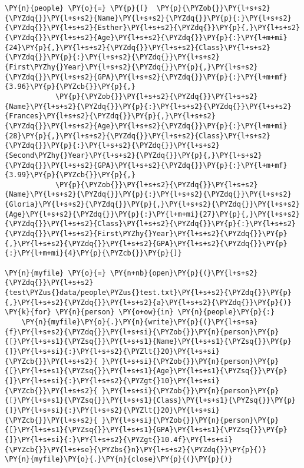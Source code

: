     \begin{tcolorbox}[breakable, size=fbox, boxrule=1pt, pad at break*=1mm,colback=cellbackground, colframe=cellborder]
\begin{Verbatim}[commandchars=\\\{\}]
\PY{n}{people} \PY{o}{=} \PY{p}{[}  \PY{p}{\PYZob{}}\PY{l+s+s2}{\PYZdq{}}\PY{l+s+s2}{Name}\PY{l+s+s2}{\PYZdq{}}\PY{p}{:}\PY{l+s+s2}{\PYZdq{}}\PY{l+s+s2}{Esther}\PY{l+s+s2}{\PYZdq{}}\PY{p}{,}\PY{l+s+s2}{\PYZdq{}}\PY{l+s+s2}{Age}\PY{l+s+s2}{\PYZdq{}}\PY{p}{:}\PY{l+m+mi}{24}\PY{p}{,}\PY{l+s+s2}{\PYZdq{}}\PY{l+s+s2}{Class}\PY{l+s+s2}{\PYZdq{}}\PY{p}{:}\PY{l+s+s2}{\PYZdq{}}\PY{l+s+s2}{First\PYZhy{}Year}\PY{l+s+s2}{\PYZdq{}}\PY{p}{,}\PY{l+s+s2}{\PYZdq{}}\PY{l+s+s2}{GPA}\PY{l+s+s2}{\PYZdq{}}\PY{p}{:}\PY{l+m+mf}{3.96}\PY{p}{\PYZcb{}}\PY{p}{,}
            \PY{p}{\PYZob{}}\PY{l+s+s2}{\PYZdq{}}\PY{l+s+s2}{Name}\PY{l+s+s2}{\PYZdq{}}\PY{p}{:}\PY{l+s+s2}{\PYZdq{}}\PY{l+s+s2}{Frances}\PY{l+s+s2}{\PYZdq{}}\PY{p}{,}\PY{l+s+s2}{\PYZdq{}}\PY{l+s+s2}{Age}\PY{l+s+s2}{\PYZdq{}}\PY{p}{:}\PY{l+m+mi}{28}\PY{p}{,}\PY{l+s+s2}{\PYZdq{}}\PY{l+s+s2}{Class}\PY{l+s+s2}{\PYZdq{}}\PY{p}{:}\PY{l+s+s2}{\PYZdq{}}\PY{l+s+s2}{Second\PYZhy{}Year}\PY{l+s+s2}{\PYZdq{}}\PY{p}{,}\PY{l+s+s2}{\PYZdq{}}\PY{l+s+s2}{GPA}\PY{l+s+s2}{\PYZdq{}}\PY{p}{:}\PY{l+m+mf}{3.99}\PY{p}{\PYZcb{}}\PY{p}{,}
            \PY{p}{\PYZob{}}\PY{l+s+s2}{\PYZdq{}}\PY{l+s+s2}{Name}\PY{l+s+s2}{\PYZdq{}}\PY{p}{:}\PY{l+s+s2}{\PYZdq{}}\PY{l+s+s2}{Gloria}\PY{l+s+s2}{\PYZdq{}}\PY{p}{,}\PY{l+s+s2}{\PYZdq{}}\PY{l+s+s2}{Age}\PY{l+s+s2}{\PYZdq{}}\PY{p}{:}\PY{l+m+mi}{27}\PY{p}{,}\PY{l+s+s2}{\PYZdq{}}\PY{l+s+s2}{Class}\PY{l+s+s2}{\PYZdq{}}\PY{p}{:}\PY{l+s+s2}{\PYZdq{}}\PY{l+s+s2}{First\PYZhy{}Year}\PY{l+s+s2}{\PYZdq{}}\PY{p}{,}\PY{l+s+s2}{\PYZdq{}}\PY{l+s+s2}{GPA}\PY{l+s+s2}{\PYZdq{}}\PY{p}{:}\PY{l+m+mi}{4}\PY{p}{\PYZcb{}}\PY{p}{]}

\PY{n}{myfile} \PY{o}{=} \PY{n+nb}{open}\PY{p}{(}\PY{l+s+s2}{\PYZdq{}}\PY{l+s+s2}{test\PYZus{}data/people\PYZus{}test.txt}\PY{l+s+s2}{\PYZdq{}}\PY{p}{,}\PY{l+s+s2}{\PYZdq{}}\PY{l+s+s2}{a}\PY{l+s+s2}{\PYZdq{}}\PY{p}{)}
\PY{k}{for} \PY{n}{person} \PY{o+ow}{in} \PY{n}{people}\PY{p}{:}
    \PY{n}{myfile}\PY{o}{.}\PY{n}{write}\PY{p}{(}\PY{l+s+sa}{f}\PY{l+s+s2}{\PYZdq{}}\PY{l+s+si}{\PYZob{}}\PY{n}{person}\PY{p}{[}\PY{l+s+s1}{\PYZsq{}}\PY{l+s+s1}{Name}\PY{l+s+s1}{\PYZsq{}}\PY{p}{]}\PY{l+s+si}{:}\PY{l+s+s2}{\PYZlt{}20}\PY{l+s+si}{\PYZcb{}}\PY{l+s+s2}{ }\PY{l+s+si}{\PYZob{}}\PY{n}{person}\PY{p}{[}\PY{l+s+s1}{\PYZsq{}}\PY{l+s+s1}{Age}\PY{l+s+s1}{\PYZsq{}}\PY{p}{]}\PY{l+s+si}{:}\PY{l+s+s2}{\PYZgt{}10}\PY{l+s+si}{\PYZcb{}}\PY{l+s+s2}{ }\PY{l+s+si}{\PYZob{}}\PY{n}{person}\PY{p}{[}\PY{l+s+s1}{\PYZsq{}}\PY{l+s+s1}{Class}\PY{l+s+s1}{\PYZsq{}}\PY{p}{]}\PY{l+s+si}{:}\PY{l+s+s2}{\PYZlt{}20}\PY{l+s+si}{\PYZcb{}}\PY{l+s+s2}{ }\PY{l+s+si}{\PYZob{}}\PY{n}{person}\PY{p}{[}\PY{l+s+s1}{\PYZsq{}}\PY{l+s+s1}{GPA}\PY{l+s+s1}{\PYZsq{}}\PY{p}{]}\PY{l+s+si}{:}\PY{l+s+s2}{\PYZgt{}10.4f}\PY{l+s+si}{\PYZcb{}}\PY{l+s+se}{\PYZbs{}n}\PY{l+s+s2}{\PYZdq{}}\PY{p}{)}
\PY{n}{myfile}\PY{o}{.}\PY{n}{close}\PY{p}{(}\PY{p}{)}
\end{Verbatim}
\end{tcolorbox}

